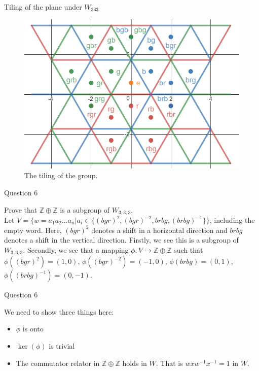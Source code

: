 \documentclass[usenames,dvipsnames]{beamer}
\newcommand{\Z}{\mathbb{Z}}
\begin{document}
\begin{frame}{Tiling of the plane under $W_{333}$}

\begin{figure}[h]
    \centering
    \includegraphics[width=.7\textwidth]{images/6-05-rbg_rbg_3-tiling.png}
    \caption{The tiling of the group.}
\end{figure}

\end{frame}

\begin{frame}{Question 6}

Prove that $\Z \oplus \Z$ is a subgroup of $W_{3,3,3}$.\\

Let $V=\{w={a_1a_2\ldots a_n} | a_i\in\{(bgr)^2,(bgr)^{-2},brbg,(brbg)^{-1}\}\}$, including the empty
word. Here, $(bgr)^2$ denotes a shift in a horizontal direction and $brbg$ denotes a shift in the vertical
direction. Firstly, we see this is a subgroup of $W_{3,3,3}$. Secondly, we see that a mapping
$\phi:V\rightarrow \Z \oplus \Z$ such that $\phi((bgr)^2)=(1,0)$, $\phi((bgr)^{-2})=(-1,0)$,
$\phi(brbg)=(0,1)$, $\phi((brbg)^{-1})=(0,-1)$.


\end{frame}

\begin{frame}{Question 6}

We need to show three things here:

\begin{itemize}
\item $\phi$ is onto
\item $\ker(\phi)$ is trivial
\item The commutator relator in $\Z \oplus \Z$ holds in $W$. That is $wxw^{-1}x^{-1}=1$  in $W$.
\end{itemize}

\end{frame}
\end{document}
